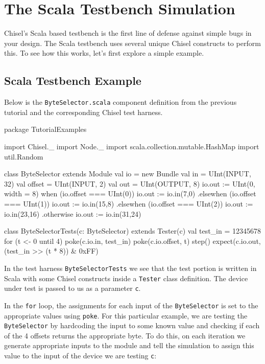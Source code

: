 \section{The Scala Testbench Simulation}

Chisel's Scala based testbench is the first line of defense against simple bugs in your design. The Scala testbench uses several unique Chisel constructs to perform this. To see how this works, let's first explore a simple example.

\subsection{Scala Testbench Example}

Below is the \verb+ByteSelector.scala+ component definition from the previous tutorial and the corresponding Chisel test harness.

\begin{scala}
package TutorialExamples

import Chisel._
import Node._
import scala.collection.mutable.HashMap
import util.Random

class ByteSelector extends Module {
  val io = new Bundle {
    val in     = UInt(INPUT, 32)
    val offset = UInt(INPUT, 2)
    val out    = UInt(OUTPUT, 8)
  }
  io.out := UInt(0, width = 8)
  when (io.offset === UInt(0)) {
    io.out := io.in(7,0)
  } .elsewhen (io.offset === UInt(1)) {
    io.out := io.in(15,8)
  } .elsewhen (io.offset === UInt(2)) {
    io.out := io.in(23,16)
  } .otherwise {
    io.out := io.in(31,24)
  }    
}

class ByteSelectorTests(c: ByteSelector) extends Tester(c) {
  val test_in = 12345678
  for (t <- 0 until 4) {
    poke(c.io.in,     test_in)
    poke(c.io.offset, t)
    step()
    expect(c.io.out, (test_in >> (t * 8)) & 0xFF)
  }
}
\end{scala}

In the test harness \verb+ByteSelectorTests+ we see that the test portion is written in Scala with some Chisel constructs inside a \verb+Tester+ class definition. The device under test is passed to us as a parameter \verb+c+. 

In the \verb+for+ loop, the assignments for each input of the \verb+ByteSelector+ is set to the appropriate values using \verb+poke+. For this particular example, we are testing the \verb+ByteSelector+ by hardcoding the input to some known value and checking if each of the 4 offsets returns the appropriate byte. To do this, on each iteration we generate appropriate inputs to the module and tell the simulation to assign this value to the input of the device we are testing \verb+c+:

